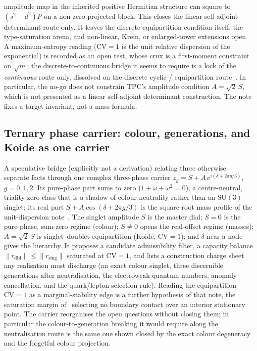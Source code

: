 \documentclass[11pt,a4paper]{article}
\theoremstyle{definition}
\newcommand{\SU}{\mathrm{SU}}
\begin{document}
      amplitude map in the inherited positive Hermitian structure can square to $(s^2-d^2)P$ on a non-zero
      projected block.
      This closes the linear self-adjoint determinant route only.
      It leaves the discrete equipartition condition itself, the type-saturation arena, and non-linear, Krein, or
      enlarged-tower extensions open.
      A maximum-entropy reading ($\mathrm{CV}=1$ is the unit relative dispersion of the exponential) is recorded as
      an open test, whose crux is a first-moment constraint on $\sqrt m$; the discrete-to-continuous bridge it
      seems to require is a lock of the \emph{continuous} route only, dissolved on the discrete cyclic /
      equipartition route~\cite{Beau2026tpc}.
      In particular, the no-go does not constrain TPC's amplitude condition $A=\sqrt2\,S$, which is not presented
      as a linear self-adjoint determinant construction.
      The note fixes a target invariant, not a mass formula.

    \subsection{Ternary phase carrier: colour, generations, and Koide as one carrier~\cite{Beau2026tpc}}
      A speculative bridge (explicitly not a derivation) relating three otherwise separate facts through one
      complex three-phase carrier $z_g = S + A\,e^{i(\delta + 2\pi g/3)}$, $g = 0,1,2$.
      Its pure-phase part sums to zero ($1+\omega+\omega^2=0$), a centre-neutral, triality-zero class that is a
      shadow of colour neutrality rather than an $\SU(3)$ singlet; its real part $S + A\cos(\delta + 2\pi g/3)$ is
      the square-root mass profile of the
      unit-dispersion note~\cite{Beau2026kud}.
      The singlet amplitude $S$ is the master dial: $S=0$ is the pure-phase, sum-zero regime (colour); $S\neq0$
      opens the real-offset regime (masses); $A=\sqrt2\,S$ is singlet--doublet equipartition (Koide,
      $\mathrm{CV}=1$); and $\delta$ near a node gives the hierarchy.
      It proposes a candidate admissibility filter, a capacity balance
      $\lVert r_{\mathrm{dbl}}\rVert \le \lVert r_{\mathrm{sing}}\rVert$ saturated at $\mathrm{CV}=1$, and lists a
      construction charge sheet any realisation must discharge (an exact colour singlet, three discernible
      generations after neutralisation, the electroweak quantum numbers, anomaly cancellation, and the
      quark/lepton selection rule).
      Reading the equipartition $\mathrm{CV}=1$ as a marginal-stability edge is a further hypothesis of that note, the
      saturation margin of~\cite{Beau2026bim} selecting no boundary contact over an interior stationary point.
      The carrier reorganises the open questions without closing them; in particular the colour-to-generation
      breaking it would require along the neutralisation route is the same one shown closed by the exact colour
      degeneracy and the forgetful colour projection.
\end{document}
